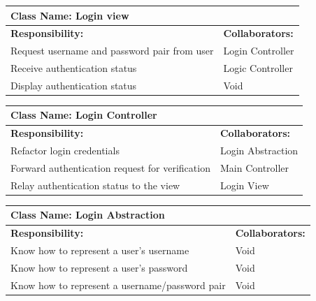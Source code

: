 \documentclass[]{article}
\begin{document}
	 
	\begin{table}[H]
	\centering
		\begin{tabular}{|p{9cm}|p{3cm}|}
		\hline
		 \multicolumn{2}{|l|}{\textbf{Class Name: Login view}} \\
		\hline
		\textbf{Responsibility:} & \textbf{Collaborators:} \\
		\hline
		Request username and password pair from user & Login Controller\\
		\hline
		Receive authentication status & Logic Controller\\
		\hline
		Display authentication status & Void\\
		\hline
		\end{tabular}
	\end{table}
	
	\begin{table}[H]
	\centering
		\begin{tabular}{|p{9cm}|p{3cm}|}
		\hline
		 \multicolumn{2}{|l|}{\textbf{Class Name: Login Controller}} \\
		\hline
		\textbf{Responsibility:} & \textbf{Collaborators:} \\
		\hline
	    Refactor login credentials & Login Abstraction\\
		\hline
		Forward authentication request for verification & Main Controller\\
		\hline
		Relay authentication status to the view & Login View\\
		\hline
		\end{tabular}
	\end{table}
	
	\begin{table}[H]
	\centering
		\begin{tabular}{|p{9cm}|p{3cm}|}
		\hline
		 \multicolumn{2}{|l|}{\textbf{Class Name: Login Abstraction}} \\
		\hline
		\textbf{Responsibility:} & \textbf{Collaborators:} \\
		\hline
	    Know how to represent a user's username & Void\\
		\hline
		Know how to represent a user's password & Void\\
		\hline
		Know how to represent a username/password pair & Void\\
		\hline
		\end{tabular}
	\end{table}
	
\end{document}
